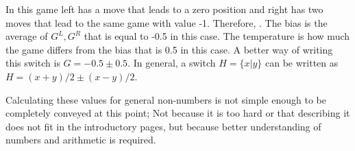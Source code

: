 \begin{figure} [!ht]
	\begin{center}
	\end{center}
	\caption{}
\end{figure}

In this game left has a move that leads to a zero position and right has two moves that lead to the same game with value -1. Therefore, . The bias is the average of $G^L, G^R$ that is equal to -0.5 in this case. The temperature is how much the game differs from the bias that is 0.5 in this case. A better way of writing this switch is $G = -0.5 \pm 0.5$. In general, a switch $H = \{x| y\}$ can be written as $H = (x+y)/2 \pm (x-y)/2$.

Calculating these values for general non-numbers is not simple enough to be completely conveyed at this point; Not because it is too hard or that describing it does not fit in the introductory pages, but because better understanding of numbers and arithmetic is required.






